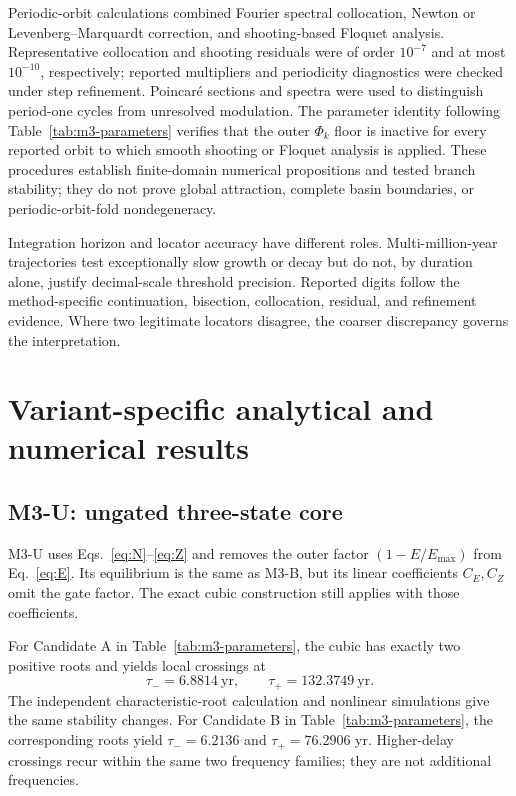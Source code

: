 \documentclass[11pt]{article}
\begin{document}
Periodic-orbit calculations combined Fourier spectral collocation, Newton or Levenberg--Marquardt correction, and shooting-based Floquet analysis. Representative collocation and shooting residuals were of order $10^{-7}$ and at most $10^{-10}$, respectively; reported multipliers and periodicity diagnostics were checked under step refinement. Poincar\'e sections and spectra were used to distinguish period-one cycles from unresolved modulation. The parameter identity following Table~\ref{tab:m3-parameters} verifies that the outer $\Phi_k$ floor is inactive for every reported orbit to which smooth shooting or Floquet analysis is applied. These procedures establish finite-domain numerical propositions and tested branch stability; they do not prove global attraction, complete basin boundaries, or periodic-orbit-fold nondegeneracy.

Integration horizon and locator accuracy have different roles. Multi-million-year trajectories test exceptionally slow growth or decay but do not, by duration alone, justify decimal-scale threshold precision. Reported digits follow the method-specific continuation, bisection, collocation, residual, and refinement evidence. Where two legitimate locators disagree, the coarser discrepancy governs the interpretation.

\section{Variant-specific analytical and numerical results}

\subsection{M3-U: ungated three-state core}

M3-U uses Eqs.~\eqref{eq:N}--\eqref{eq:Z} and removes the outer factor $(1-E/E_{\max})$ from Eq.~\eqref{eq:E}. Its equilibrium is the same as M3-B, but its linear coefficients $C_E,C_Z$ omit the gate factor. The exact cubic construction still applies with those coefficients.

For Candidate A in Table~\ref{tab:m3-parameters}, the cubic has exactly two positive roots and yields local crossings at
\[
\tau_-=6.8814\ \text{yr},\qquad \tau_+=132.3749\ \text{yr}.
\]
The independent characteristic-root calculation and nonlinear simulations give the same stability changes. For Candidate B in Table~\ref{tab:m3-parameters}, the corresponding roots yield $\tau_-=6.2136$ and $\tau_+=76.2906$ yr. Higher-delay crossings recur within the same two frequency families; they are not additional frequencies.
\end{document}
